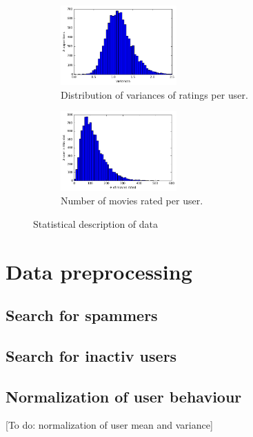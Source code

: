 \documentclass[10pt,conference,compsocconf]{IEEEtran}
\begin{document}
\begin{figure}[htbp]
    \centering
    \hspace{-0.6cm}
    \begin{subfigure}[t]{0.45\columnwidth}
        \centering
        \includegraphics[height=1.2in]{img/Variances}
        \vspace{-3mm}
  \caption{Distribution of variances of ratings per user.}
    \end{subfigure}%
    \hspace{0.4cm}
    \begin{subfigure}[t]{0.45\columnwidth}
        \centering
        \includegraphics[height=1.2in]{img/Ratings}
        \vspace{-3mm}
        \caption{Number of movies rated per user.}
    \end{subfigure}
    \caption{Statistical description of data}
\end{figure}


\section{Data preprocessing}

\subsection{Search for spammers}

\subsection{Search for inactiv users}

\subsection{Normalization of user behaviour}
[To do: normalization of user mean and variance]
\end{document}
